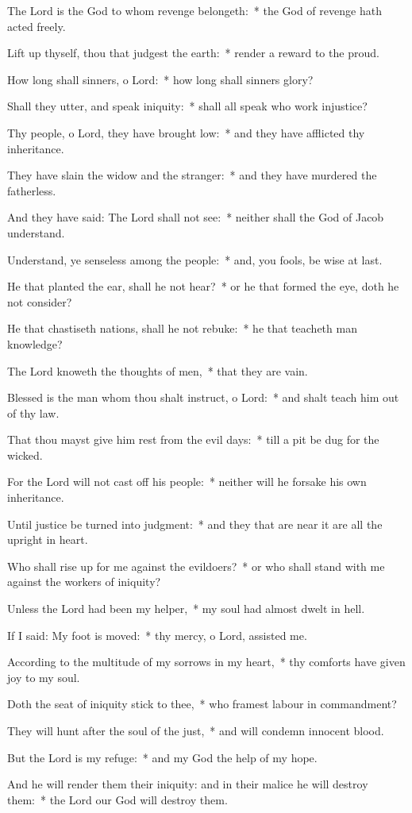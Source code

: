\begin{enpars}
\item The Lord is the God to whom revenge belongeth:~* the God of revenge hath acted freely.
\item Lift up thyself, thou that judgest the earth:~* render a reward to the proud.
\item How long shall sinners, o Lord:~* how long shall sinners glory?
\item Shall they utter, and speak iniquity:~* shall all speak who work injustice?
\item Thy people, o Lord, they have brought low:~* and they have afflicted thy inheritance.
\item They have slain the widow and the stranger:~* and they have murdered the fatherless.
\item And they have said: The Lord shall not see:~* neither shall the God of Jacob understand.
\item Understand, ye senseless among the people:~* and, you fools, be wise at last.
\item He that planted the ear, shall he not hear?~* or he that formed the eye, doth he not consider?
\item He that chastiseth nations, shall he not rebuke:~* he that teacheth man knowledge?
\item The Lord knoweth the thoughts of men,~* that they are vain.
\item Blessed is the man whom thou shalt instruct, o Lord:~* and shalt teach him out of thy law.
\item That thou mayst give him rest from the evil days:~* till a pit be dug for the wicked.
\item For the Lord will not cast off his people:~* neither will he forsake his own inheritance.
\item Until justice be turned into judgment:~* and they that are near it are all the upright in heart.
\item Who shall rise up for me against the evildoers?~* or who shall stand with me against the workers of iniquity?
\item Unless the Lord had been my helper,~* my soul had almost dwelt in hell.
\item If I said: My foot is moved:~* thy mercy, o Lord, assisted me.
\item According to the multitude of my sorrows in my heart,~* thy comforts have given joy to my soul.
\item Doth the seat of iniquity stick to thee,~* who framest labour in commandment?
\item They will hunt after the soul of the just,~* and will condemn innocent blood.
\item But the Lord is my refuge:~* and my God the help of my hope.
\item And he will render them their iniquity: and in their malice he will destroy them:~* the Lord our God will destroy them.
\end{enpars}